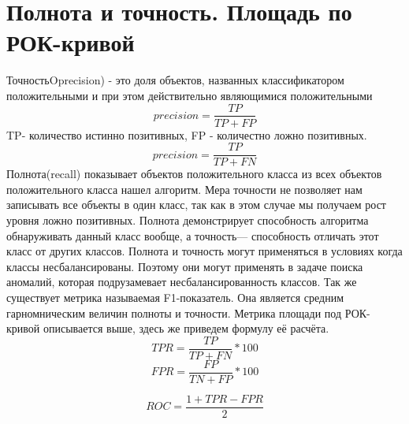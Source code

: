 \section{Полнота и точность. Площадь по РОК-кривой}
ТочностьOprecision) - это доля объектов, названных классификатором положительными и при этом действительно являющимися положительными
	\begin{equation}
precision= \frac{TP}{TP+FP}
	\end{equation}
TP- количество истинно позитивных, FP - количестно ложно позитивных.
	\newline
	\begin{equation}
	precision= \frac{TP}{TP+FN}
	\end{equation}
	Полнота(recall) показывает объектов положительного класса из всех объектов положительного класса нашел алгоритм.
	Мера точности не позволяет нам записывать все объекты в один класс, так как в этом случае мы получаем рост уровня ложно позитивных. Полнота демонстрирует способность алгоритма обнаруживать данный класс вообще, а точность— способность отличать этот класс от других классов. Полнота и точность могут применяться в условиях когда классы несбалансированы\cite{def06}. Поэтому они могут применять в задаче поиска аномалий, которая подрузамевает несбалансированность классов.
	Так же существует метрика называемая F1-показатель. Она является средним гарномническим величин полноты и точности.
	Метрика площади под РОК-кривой описывается выше, здесь же приведем формулу её расчёта.
	\begin{equation}
	TPR=\frac{TP}{TP+FN}*100
	\end{equation}
		\begin{equation}
	FPR=\frac{FP}{TN+FP}*100 
		\end{equation}
		

		\begin{equation}
	ROC=\frac{1 + TPR - FPR}{2} 
		\end{equation}
	
